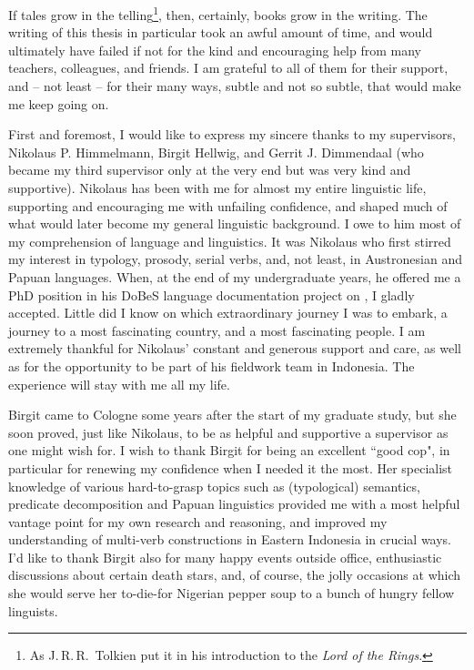 
If tales grow in the telling\footnote{As J.\,R.\,R.\, Tolkien put it in his introduction to the \textit{Lord of the Rings}.}, then, certainly, books grow in the writing. The writing of this thesis in particular took an awful amount of time, and would ultimately have failed if not for the kind and encouraging help from many teachers, colleagues, and friends. I am grateful to all of them for their support, and -- not least -- for their many ways, subtle and not so subtle, that would make me keep going on.

First and foremost, I would like to express my sincere thanks to my supervisors, Nikolaus P. Himmelmann, Birgit Hellwig, and Gerrit J. Dimmendaal (who became my third supervisor only at the very end but was very kind and supportive). Nikolaus has been with me for almost my entire linguistic life, supporting and encouraging me with unfailing confidence, and shaped much of what would later become my general linguistic background. I owe to him most of my comprehension of language and linguistics. It was Nikolaus who first stirred my interest in typology, prosody, serial verbs, and, not least, in Austronesian and Papuan languages. When, at the end of my undergraduate years, he offered me a PhD position in his DoBeS language documentation project on , I gladly accepted. Little did I know on which extraordinary journey I was to embark, a journey to a most fascinating country, and a most fascinating people. I am extremely thankful for Nikolaus' constant and generous support and care, as well as for the opportunity to be part of his fieldwork team in Indonesia. The experience will stay with me all my life.

Birgit came to Cologne some years after the start of my graduate study, but she soon proved, just like Nikolaus, to be as helpful and supportive a supervisor as one might wish for. I wish to thank Birgit for being an excellent ``good cop", in particular for renewing my confidence when I needed it the most. Her specialist knowledge of various hard-to-grasp topics such as (typological) semantics, predicate decomposition and Papuan linguistics provided me with a most helpful vantage point for my own research and reasoning, and improved my understanding of multi-verb constructions in Eastern Indonesia in crucial ways. I'd like to thank Birgit also for many happy events outside office, enthusiastic discussions about certain death stars, and, of course, the jolly occasions at which she would serve her to-die-for Nigerian pepper soup to a bunch of hungry fellow linguists.

